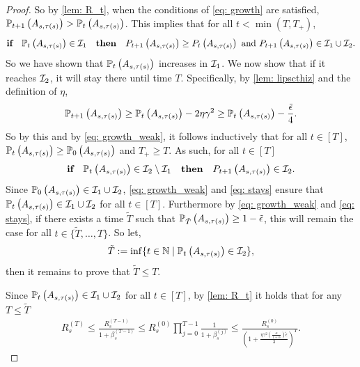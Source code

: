 \documentclass{article}
\theoremstyle{plain}
\theoremstyle{definition}
\theoremstyle{remark}
\begin{document}
\begin{proof}
    So by \cref{lem: R_t}, when the conditions of \eqref{eq: growth} are satisfied, $\P_{t+1}\left(A_{s, \tau(s)} \right) > \P_t\left(A_{s, \tau(s)} \right)$. This implies that for all $t<\min(T, T_+)$,
    \begin{align}\label{eq: growth_weak}     
        \textbf{if} \quad \P_t\left(A_{s, \tau(s)} \right) \in \Ical_1 \quad \textbf{then} \quad P_{t+1}\left(A_{s, \tau(s)}\right) \geq P_{t}\left(A_{s, \tau(s)}\right) \text{ and } P_{t+1}\left(A_{s, \tau(s)}\right)\in \Ical_1 \cup \Ical_2.
    \end{align}
    So we have shown that $\P_t\left(A_{s, \tau(s)} \right)$ increases in $\Ical_1$. We now show that if it reaches $\Ical_2$, it will stay there until time $T$. Specifically, by \cref{lem: lipscthiz} and the definition of $\eta$,  
    \begin{align*}
        \P_{t+1}\left(A_{s, \tau(s)} \right) \geq \P_t\left(A_{s, \tau(s)} \right) - 2\eta \gamma^2 \geq \P_t\left(A_{s, \tau(s)} \right) - \frac{\tilde \epsilon}{4}.
    \end{align*}
    So by this and by \eqref{eq: growth_weak}, it follows inductively that for all $t\in[T]$, $\P_t\left(A_{s, \tau(s)} \right) \geq \P_0\left(A_{s, \tau(s)} \right)$ and $T_+ \geq T$. 
    As such, for all $t \in [T]$
    \begin{align}\label{eq: stays}     
        \textbf{if} \quad \P_t\left(A_{s, \tau(s)} \right) \in \Ical_2\setminus \Ical_1 \quad \textbf{then} \quad P_{t+1}\left(A_{s, \tau(s)}\right) \in \Ical_2.
    \end{align}
    Since $\P_{0}\left(A_{s, \tau(s)}\right) \in \Ical_1 \cup \Ical_2$, \eqref{eq: growth_weak} and \eqref{eq: stays} ensure that $\P_t\left(A_{s, \tau(s)} \right) \in \Ical_1 \cup \Ical_2$ for all $t \in [T]$.
    Furthermore by \eqref{eq: growth_weak} and \eqref{eq: stays}, if there exists a time $\tilde T$ such that $\P_{\tilde T}\left(A_{s, \tau(s)} \right) \geq 1-\tilde \epsilon$, this will remain the case for all $t\in\{\tilde T, \ldots, T\}$. So let,
    \begin{align*}
        \tilde T := \inf\{t\in \N \mid \P_t\left(A_{s, \tau(s)} \right) \in \Ical_2\}, 
    \end{align*}
    then it remains to prove that $\tilde T \leq T$. 

    Since $\P_t\left(A_{s, \tau(s)} \right) \in \Ical_1 \cup \Ical_2$ for all $t\in [T]$, by \cref{lem: R_t} it holds that for any $T \leq \tilde T$
    \begin{align*}
        R_s^{(T)} \leq  \frac{R_s^{(T-1)}}{1 + \beta_s^{(T-1)}} \leq R_s^{(0)} \prod_{j=0}^{T-1}\frac{1}{1 + \beta_{s}^{(j)}} \leq \frac{R_s^{(0)}}{\left(1 + \frac{\eta \gamma^2 \left(\frac{\alpha}{1+\alpha}\right) \tilde \epsilon}{3} \right)^{T}}.
    \end{align*}


\end{proof}
\end{document}
